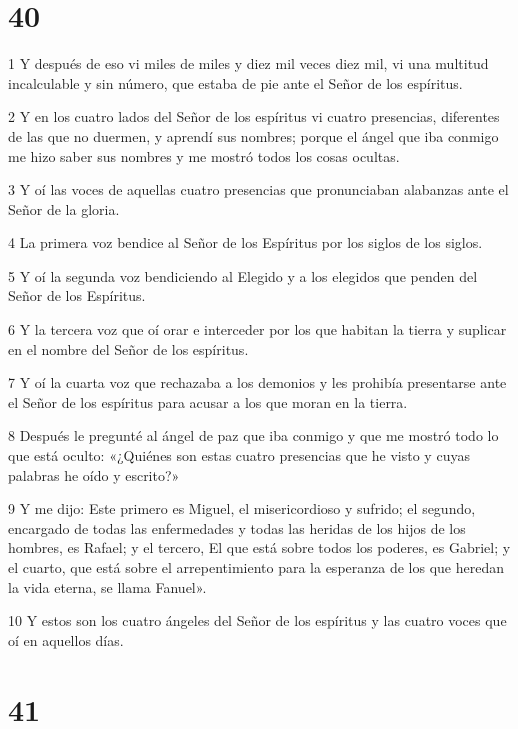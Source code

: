 \chapter{40}

\par 1 Y después de eso vi miles de miles y diez mil veces diez mil, vi una multitud incalculable y sin número, que estaba de pie ante el Señor de los espíritus.
\par 2 Y en los cuatro lados del Señor de los espíritus vi cuatro presencias, diferentes de las que no duermen, y aprendí sus nombres; porque el ángel que iba conmigo me hizo saber sus nombres y me mostró todos los cosas ocultas.
\par 3 Y oí las voces de aquellas cuatro presencias que pronunciaban alabanzas ante el Señor de la gloria.
\par 4 La primera voz bendice al Señor de los Espíritus por los siglos de los siglos.
\par 5 Y oí la segunda voz bendiciendo al Elegido y a los elegidos que penden del Señor de los Espíritus.
\par 6 Y la tercera voz que oí orar e interceder por los que habitan la tierra y suplicar en el nombre del Señor de los espíritus.
\par 7 Y oí la cuarta voz que rechazaba a los demonios y les prohibía presentarse ante el Señor de los espíritus para acusar a los que moran en la tierra.
\par 8 Después le pregunté al ángel de paz que iba conmigo y que me mostró todo lo que está oculto: «¿Quiénes son estas cuatro presencias que he visto y cuyas palabras he oído y escrito?»
\par 9 Y me dijo: Este primero es Miguel, el misericordioso y sufrido; el segundo, encargado de todas las enfermedades y todas las heridas de los hijos de los hombres, es Rafael; y el tercero, El que está sobre todos los poderes, es Gabriel; y el cuarto, que está sobre el arrepentimiento para la esperanza de los que heredan la vida eterna, se llama Fanuel».
\par 10 Y estos son los cuatro ángeles del Señor de los espíritus y las cuatro voces que oí en aquellos días.

\chapter{41}

